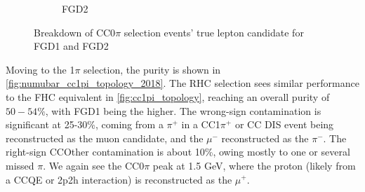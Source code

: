 \begin{figure}[h]
\begin{subfigure}[t]{0.49\textwidth}
		\caption{FGD2}
	\end{subfigure}
	\caption{Breakdown of \numubar CC0$\pi$ selection events' true lepton candidate for FGD1 and FGD2}
	\label{fig:numubar_cc0pi_muon_2018}
\end{figure}

Moving to the 1$\pi$ \numubar selection, the purity is shown in \autoref{fig:numubar_cc1pi_topology_2018}. The \numubar RHC selection sees similar performance to the \numu FHC equivalent in \autoref{fig:cc1pi_topology}, reaching an overall purity of $50-54\%$, with FGD1 being the higher. The wrong-sign contamination is significant at 25-30\%, coming from a $\pi^+$ in a CC1$\pi^+$ or CC DIS event being reconstructed as the muon candidate, and the $\mu^-$ reconstructed as the $\pi^-$. The right-sign CCOther contamination is about 10\%, owing mostly to one or several missed $\pi$. We again see the CC0$\pi$ \numu peak at 1.5 GeV, where the proton (likely from a CCQE or 2p2h interaction) is reconstructed as the $\mu^+$.

